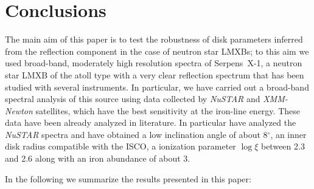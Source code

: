 \documentclass{aa}
\begin{document}
\section{Conclusions}



The main aim of this paper is to test the robustness of disk parameters inferred from 
the reflection component in the case of neutron star LMXBs; to this aim we used 
broad-band, moderately high resolution spectra of Serpens~X-1, a neutron star LMXB 
of the atoll type with a very clear reflection spectrum that has been studied with 
several instruments. In particular, we have carried out a broad-band spectral 
analysis of this source using data collected by \emph{NuSTAR} and \emph{XMM-Newton} 
satellites, which have the best sensitivity at the iron-line energy. 
These data have been already analyzed in literature. In particular 
\citet{Miller.etal:13} have analyzed the \emph{NuSTAR} spectra and have obtained 
a low inclination angle of about 8$^\circ$, an inner disk radius compatible 
with the ISCO, a ionization parameter $\log \xi$ between 2.3 and 2.6 along with an 
iron abundance of about 3. 

In the following we summarize the results presented in this paper:
\end{document}
